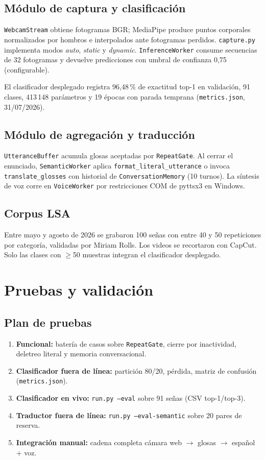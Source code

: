 \documentclass[12pt,a4paper]{report}
\begin{document}
\section{Módulo de captura y clasificación}
\texttt{WebcamStream} obtiene fotogramas BGR; MediaPipe produce puntos corporales normalizados por hombros e interpolados ante fotogramas perdidos. \texttt{capture.py} implementa modos \textit{auto}, \textit{static} y \textit{dynamic}. \texttt{InferenceWorker} consume secuencias de 32 fotogramas y devuelve predicciones con umbral de confianza 0,75 (configurable).

El clasificador desplegado registra 96,48\,\% de exactitud top-1 en validación, 91 clases, 413\,148 parámetros y 19 épocas con parada temprana (\texttt{metrics.json}, 31/07/2026).

\section{Módulo de agregación y traducción}
\texttt{UtteranceBuffer} acumula glosas aceptadas por \texttt{RepeatGate}. Al cerrar el enunciado, \texttt{SemanticWorker} aplica \texttt{format\_literal\_utterance} o invoca \texttt{translate\_glosses} con historial de \texttt{ConversationMemory} (10 turnos). La síntesis de voz corre en \texttt{VoiceWorker} por restricciones COM de pyttsx3 en Windows.

\section{Corpus LSA}
Entre mayo y agosto de 2026 se grabaron 100 señas con entre 40 y 50 repeticiones por categoría, validadas por Miriam Rolls. Los videos se recortaron con CapCut. Solo las clases con $\geq$50 muestras integran el clasificador desplegado.

\chapter{Pruebas y validación}
\section{Plan de pruebas}
\begin{enumerate}
    \item \textbf{Funcional:} batería de casos sobre \texttt{RepeatGate}, cierre por inactividad, deletreo literal y memoria conversacional.
    \item \textbf{Clasificador fuera de línea:} partición 80/20, pérdida, matriz de confusión (\texttt{metrics.json}).
    \item \textbf{Clasificador en vivo:} \texttt{run.py --eval} sobre 91 señas (CSV top-1/top-3).
    \item \textbf{Traductor fuera de línea:} \texttt{run.py --eval-semantic} sobre 20 pares de reserva.
    \item \textbf{Integración manual:} cadena completa cámara web $\rightarrow$ glosas $\rightarrow$ español + voz.
\end{enumerate}
\end{document}
